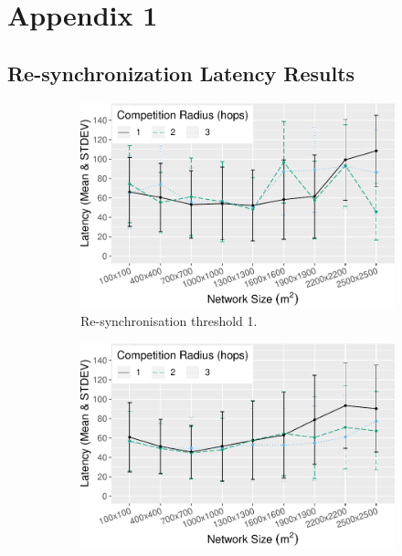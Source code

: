 \chapter{Appendix 1}
\label{app:a}
\section{Re-synchronization Latency Results}
\begin{figure}[H]
    
\centering
\begin{subfigure}{0.45\textwidth}
    \centering
    \includegraphics[width=\textwidth, keepaspectratio]{figure/Results/ParameterEvaluation/ResyncThreshold1_Latency.pdf}
    \caption{Re-synchronisation threshold 1.}
    \label{subfig:resync-treshold-1-latency}
\end{subfigure}
\begin{subfigure}{0.45\textwidth}
    \centering
    \includegraphics[width=\textwidth, keepaspectratio]{figure/Results/ParameterEvaluation/ResyncThreshold2_Latency.pdf}

\end{subfigure}
\end{figure}
